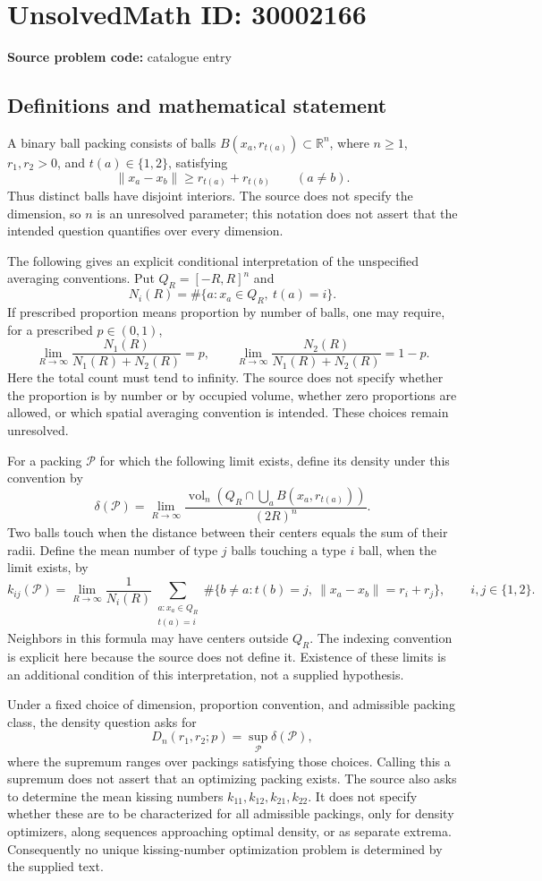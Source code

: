 \documentclass[11pt]{article}
\newcommand{\R}{\mathbb{R}}
\begin{document}
\section*{UnsolvedMath ID: 30002166}
\textbf{Source problem code:} catalogue entry
\subsection{Definitions and mathematical statement}
A binary ball packing consists of balls \(B(x_a,r_{t(a)})\subset\R^n\), where \(n\geq1\), \(r_1,r_2>0\), and \(t(a)\in\{1,2\}\), satisfying
\[
\lVert x_a-x_b\rVert\geq r_{t(a)}+r_{t(b)}\qquad(a\ne b).
\]
Thus distinct balls have disjoint interiors. The source does not specify the dimension, so \(n\) is an unresolved parameter; this notation does not assert that the intended question quantifies over every dimension.

The following gives an explicit conditional interpretation of the unspecified averaging conventions. Put \(Q_R=[-R,R]^n\) and
\[
N_i(R)=\#\{a:x_a\in Q_R,\ t(a)=i\}.
\]
If prescribed proportion means proportion by number of balls, one may require, for a prescribed \(p\in(0,1)\),
\[
\lim_{R\to\infty}\frac{N_1(R)}{N_1(R)+N_2(R)}=p,
\qquad
\lim_{R\to\infty}\frac{N_2(R)}{N_1(R)+N_2(R)}=1-p.
\]
Here the total count must tend to infinity. The source does not specify whether the proportion is by number or by occupied volume, whether zero proportions are allowed, or which spatial averaging convention is intended. These choices remain unresolved.

For a packing \(\mathcal P\) for which the following limit exists, define its density under this convention by
\[
\delta(\mathcal P)=\lim_{R\to\infty}
\frac{\operatorname{vol}_n\!\left(Q_R\cap\bigcup_a B(x_a,r_{t(a)})\right)}{(2R)^n}.
\]
Two balls touch when the distance between their centers equals the sum of their radii. Define the mean number of type \(j\) balls touching a type \(i\) ball, when the limit exists, by
\[
k_{ij}(\mathcal P)=\lim_{R\to\infty}\frac{1}{N_i(R)}
\sum_{\substack{a:x_a\in Q_R\\t(a)=i}}
\#\{b\ne a:t(b)=j,\ \lVert x_a-x_b\rVert=r_i+r_j\},
\qquad i,j\in\{1,2\}.
\]
Neighbors in this formula may have centers outside \(Q_R\). The indexing convention is explicit here because the source does not define it. Existence of these limits is an additional condition of this interpretation, not a supplied hypothesis.

Under a fixed choice of dimension, proportion convention, and admissible packing class, the density question asks for
\[
D_n(r_1,r_2;p)=\sup_{\mathcal P}\delta(\mathcal P),
\]
where the supremum ranges over packings satisfying those choices. Calling this a supremum does not assert that an optimizing packing exists. The source also asks to determine the mean kissing numbers \(k_{11},k_{12},k_{21},k_{22}\). It does not specify whether these are to be characterized for all admissible packings, only for density optimizers, along sequences approaching optimal density, or as separate extrema. Consequently no unique kissing-number optimization problem is determined by the supplied text.
\end{document}
